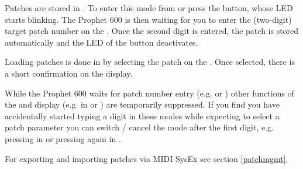 Patches are stored in \storagemode. To enter this mode from \presetmode or \livemode press the \record button, whose LED starts blinking. The Prophet 600 is then waiting for you to enter the (two-digit) target patch number on the \termnumberpad. Once the second digit is entered, the patch is stored automatically and the LED of the \record button deactivates. 

Loading patches is done in \presetpatch by selecting the patch on the \termnumberpad. Once selected, there is a short confirmation on the display.

While the Prophet 600 waits for patch number entry (e.g. \storagemode or \presetpatch) other functions of the \termnumberpad and display (e.g. in \presetpanel or \livemode) are temporarily suppressed. If you find you have accidentally started typing a digit in these modes while expecting to select a patch parameter you can switch / cancel the mode after the first digit, e.g. pressing \totape in \presetpatch or pressing \record again in \storagemode.

For exporting and importing patches via MIDI SysEx see section \ref{patchmgmt}.
